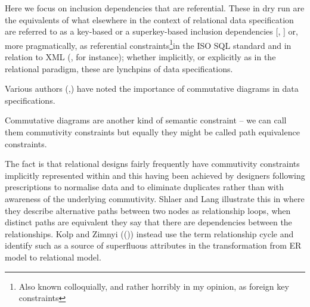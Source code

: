 \note Here we focus on inclusion dependencies that are referential. These in dry run are the equivalents of what elsewhere in the context of relational data specification are referred to as a key-based or a superkey-based inclusion dependencies [\cite{Mannila1986}, \cite{Levene2000}]
or, more pragmatically, as referential constraints\footnote{	Also known colloquially, and rather horribly in my opinion, as foreign key constraints}in the ISO SQL standard\cite{ISOSQL2016} and in relation to XML
(\cite{fan2003}, for instance); whether implicitly, or explicitly as in the relational paradigm, these are lynchpins of  data specifications.

\note Various authors (\cite{CartmellScopePaper},\cite{Johnson93}) have noted the importance of commutative diagrams in data specifications.
\begin{newtt}Commutative diagrams are another kind of semantic constraint -- we can call them commutivity constraints but equally they might be called path equivalence constraints.\end{newtt}  The fact is that relational designs fairly frequently have commutivity constraints implicitly represented within  and this having been achieved  by designers following prescriptions to normalise data and to eliminate duplicates rather than with awareness of the underlying commutivity. 
Shlaer and Lang illustrate this in \cite{Shlaer96} where they describe alternative paths between two nodes as
relationship loops, when distinct paths are equivalent they say that there are dependencies
between the relationships. Kolp and Zimnyi ((\cite{Kolp1995})) instead use the term
relationship cycle and identify such as a source of superfluous attributes in the
transformation from ER model to relational model.